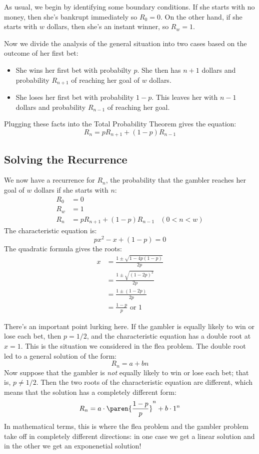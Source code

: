 As usual, we begin by identifying some boundary conditions.  If she
starts with no money, then she's bankrupt immediately so $R_0 = 0$.
On the other hand, if she starts with $w$ dollars, then she's an
instant winner, so $R_w = 1$.

Now we divide the analysis of the general situation into two cases
based on the outcome of her first bet:
%
\begin{itemize}

\item She wins her first bet with probabilty $p$.  She then has $n +
1$ dollars and probability $R_{n+1}$ of reaching her goal of $w$
dollars.

\item She loses her first bet with probability $1-p$.  This leaves her
with $n - 1$ dollars and probability $R_{n-1}$ of reaching her goal.

\end{itemize}
%
Plugging these facts into the Total Probability Theorem gives the
equation:
%
\[
R_n = p R_{n+1} + (1 - p) R_{n-1}
\]

\subsection{Solving the Recurrence}

We now have a recurrence for $R_n$, the probability that the gambler
reaches her goal of $w$ dollars if she starts with $n$:
%
\begin{align*}
R_0 & = 0 \\
R_w & = 1 \\
R_n & = p R_{n+1} + (1 - p) R_{n-1} & (0 < n < w)
\end{align*}
%
The characteristic equation is:
%
\[
p x^2 - x + (1-p) = 0
\]
%
The quadratic formula gives the roots:
%
\begin{align*}
x & = \frac{1 \pm \sqrt{1 - 4 p (1-p)}}{2p} \\
  & = \frac{1 \pm \sqrt{(1-2p)^2}}{2p} \\
  & = \frac{1 \pm (1-2p)}{2p} \\
  & = \frac{1-p}{p} \text{ or } 1
\end{align*}

There's an important point lurking here.  If the gambler is equally
likely to win or lose each bet, then $p = 1/2$, and the characteristic
equation has a double root at $x = 1$.  This is the situation we
considered in the flea problem.  The double root led to a general
solution of the form:
%
\[
R_n = a + b n
\]
%
Now suppose that the gambler is \emph{not} equally likely to win or
lose each bet; that is, $p \neq 1/2$.  Then the two roots of the
characteristic equation are different, which means that the solution
has a completely different form:
%
\[
R_n = a \cdot \paren{\frac{1-p}{p}}^n + b \cdot 1^n
\]
%
In mathematical terms, this is where the flea problem and the gambler
problem take off in completely different directions: in one case we
get a linear solution and in the other we get an exponenetial
solution!

